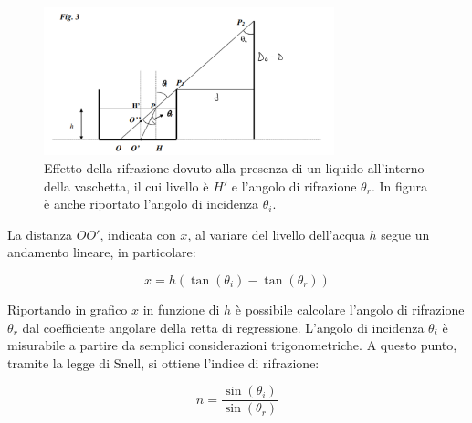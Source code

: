 \begin{figure}[H]
	\centering
	\includegraphics[width=0.75\textwidth]{./figures/Im3}
	\caption{Effetto della rifrazione dovuto alla presenza di un liquido all'interno della vaschetta, il cui livello è $H'$ e l'angolo di rifrazione $\theta_r$. In figura è anche riportato l'angolo di incidenza $\theta_i$.}
\end{figure}

La distanza $OO'$, indicata con $x$, al variare del livello dell'acqua $h$ segue un andamento lineare, in particolare: 

\begin{equation}
	x=h(\tan(\theta_i)-\tan(\theta_r))
\end{equation}

Riportando in grafico $x$ in funzione di $h$ è possibile calcolare l'angolo di rifrazione $\theta_r$ dal coefficiente angolare della retta di regressione. L'angolo di incidenza $\theta_i$ è misurabile a partire da semplici considerazioni trigonometriche. A questo punto, tramite la legge di Snell, si ottiene l'indice di rifrazione:

\begin{equation}
	n=\frac{\sin(\theta_i)}{\sin(\theta_r)}
\end{equation}

